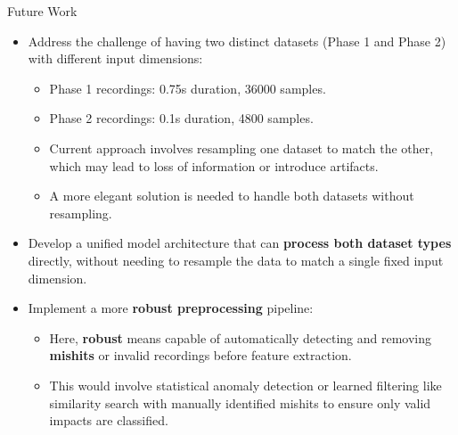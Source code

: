 \documentclass{beamer}
\begin{document}
\begin{frame}{Future Work}
\begin{itemize}

    \item Address the challenge of having two distinct datasets (Phase 1 and Phase 2) with different input dimensions:
        \begin{itemize}
            \scriptsize
            \item Phase 1 recordings: 0.75s duration, 36000 samples.
            \item Phase 2 recordings: 0.1s duration, 4800 samples.
        \end{itemize}
        \begin{itemize}
            \scriptsize
            \item Current approach involves resampling one dataset to match the other, which may lead to loss of information or introduce artifacts.
            \item A more elegant solution is needed to handle both datasets without resampling.
        \end{itemize}
    \item Develop a unified model architecture that can \textbf{process both dataset types} directly, without needing to resample the data to match a single fixed input dimension.
    \item Implement a more \textbf{robust preprocessing} pipeline:
        \begin{itemize}
            \scriptsize
            \item Here, \textbf{robust} means capable of automatically detecting and removing \textbf{mishits} or invalid recordings before feature extraction.
            \item This would involve statistical anomaly detection or learned filtering like similarity search with manually identified mishits to ensure only valid impacts are classified.
        \end{itemize}
    
\end{itemize}
\end{frame}
\end{document}
